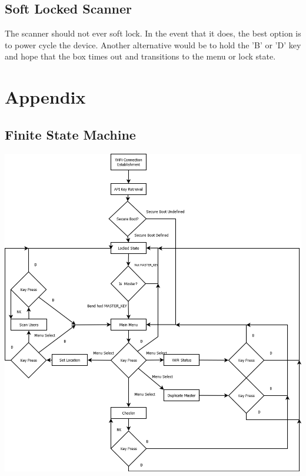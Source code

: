 \documentclass{article}
\begin{document}
\subsection{Soft Locked Scanner}
The scanner should not ever soft lock.  In the event that it does, the best option is to power cycle the device.  Another alternative would be to hold the 'B' or 'D' key and hope that the box times out and transitions to the menu or lock state.

\section{Appendix}

\subsection{Finite State Machine}
\begin{center}\includegraphics[scale=0.25]{states}\end{center}
\end{document}
